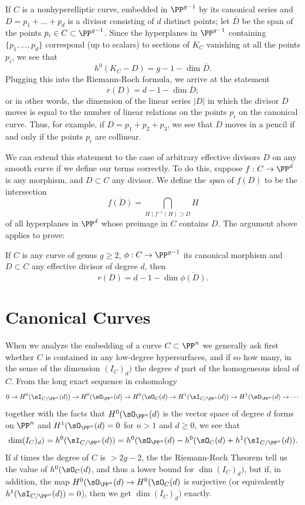 If $C$ is a nonhyperelliptic curve, embedded in $\PP^{g-1}$ by its canonical series and  $D = p_1+\dots + p_d$ is a divisor consisting of $d$ distinct points; let $\overline D$ be the span of the points $p_i \in C \subset \PP^{g-1}$. Since the hyperplanes in $\PP^{g-1}$ containing $\{p_1,\dots,p_d\}$ correspond (up to scalars) to sections of $K_C$ vanishing at all the points $p_i$, we see that
$$
h^0(K_C-D) = g - 1 - \dim \overline D.
$$
Plugging this into the Riemann-Roch formula, we arrive at the statement
$$
r(D) = d - 1 - \dim \overline D;
$$
or in other words, the dimension of the linear series $|D|$ in which the divisor $D$ moves is equal to the number of linear relations on the points $p_i$ on the canonical curve. Thus, for example, if $D = p_1+p_2+p_3$, we see that $D$ moves in a pencil if and only if the points $p_i$ are collinear.

We can extend this statement to the case of arbitrary effective divisors $D$ on any smooth curve if we define our terms correctly. To do this, suppose $f : C \to \PP^d$ is any morphism, and $D \subset C$ any divisor. We define the \emph{span} of  $f(D)$ to be the intersection
$$
\overline{f(D)} = \bigcap_{H \mid f^{-1}(H)\supset D} H 
$$
of all hyperplanes in $\PP^d$ whose preimage in $C$ contains $D$. The argument above applies to prove:

\begin{theorem}\label{geometric RR}
If $C$ is any curve of genus $g \geq 2$,  $\phi : C \to \PP^{g-1}$ its canonical morphism and $D \subset C$ any effective divisor of degree $d$, then
$$
r(D) = d - 1 - \dim \overline{\phi(D)}.
$$
\end{theorem}
 
 \section{Canonical Curves}\label{Noether theorem section}

When we analyze the embedding of a curve $C\subset \PP^n$ we generally ask first whether $C$ is contained in any low-degree
hypersurfaces, and if so how many, in the sense of the dimension $(I_C)_d)$ the degree $d$ part of the homogeneous ideal of $C$.
From the long exact sequence in cohomology
$$
0\to H^0(\sI_{C/\PP^n}(d)) \to H^0(\sO_{\PP^n}(d) \to H^0(\sO_C(d) \to H^1(\sI_{C/\PP^n}(d)) \to H^1(\sO_{\PP^n}(d) \to\cdots
$$
together with the facts that  $H^0(\sO_{\PP^n}(d)$ is the vector space of degree $d$ forms on $\PP^n$ and 
 $H^1(\sO_{\PP^n}(d) = 0$ for $n>1$ and $d\geq 0$, we see that
 $$
 \dim (I_C)_d) = h^0(\sI_{C/\PP^n}(d)) = h^0(\sO_{\PP^n}(d) - h^0(\sO_C(d) + h^1(\sI_{C/\PP^n}(d)).
$$
If $d$ times the degree of $C$ is $>2g-2$, the the Riemann-Roch Theorem tell us the value of
 $h^0(\sO_C(d)$, and thus a lower bound for $ \dim (I_C)_d)$, but if, in addition, the map
 $H^0(\sO_{\PP^n}(d) \to H^0(\sO_C(d)$ is surjective (or equivalently $h^1(\sI_{C/\PP^n}(d))=0$),
 then we get $ \dim (I_C)_d)$ exactly.
 
